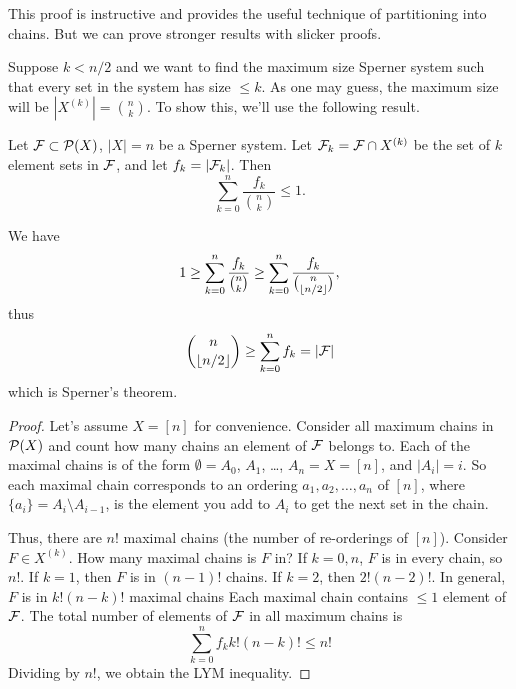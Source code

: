 \begin{remark}
This proof is instructive and provides the useful technique of partitioning into chains. But we can prove stronger results with slicker proofs.
\end{remark}
Suppose $k< n/2$ and we want to find the maximum size Sperner system such that every set in the system has size $\leq k$.
As one may guess, the maximum size will be $|X^{(k)}| = {n\choose k}$. To show this, we'll use the following result.
\begin{theorem} 
\label{thm:LYM_inequality}
Let $\F\subset \P(X)$, $|X|=n$ be a Sperner system.
Let $\F_k = \F\cap X^{(k)}$ be the set of $k$ element sets in $\F$, and let $f_k = |\F_k|$. Then
\begin{equation}	\tag{LYM} 
\label{eq:LYM}
\sum_{k=0}^n \frac{f_k}{{n\choose k}} \leq 1.
\end{equation}
\end{theorem}
\begin{remark}
We have
\[
1 \geq \sum_{k=0}^n \frac{f_k}{{n\choose k}} \geq \sum_{k=0}^n \frac{f_k}{{n\choose \floor{n/2}}},
\]
thus
\[
{n\choose \floor{n/2}} \geq \sum_{k=0}^n f_k = |\F|
\]
which is Sperner's theorem.
\end{remark}
\begin{proof} Let's assume $X=[n]$ for convenience.
Consider all maximum chains in $\P(X)$ and count how many chains an element of $\F$ belongs to. Each of the maximal chains is of the form $\emptyset = A_0$, $A_1$, \ldots, $A_n = X = [n]$, and $|A_i| = i$. So each maximal chain corresponds to an ordering $a_1,a_2,\dotsc,a_n$ of $[n]$, where $\{a_i\} = A_i \setminus A_{i-1}$, is the element you add to $A_i$ to get the next set in the chain.

Thus, there are $n!$ maximal chains (the number of re-orderings of $[n]$). Consider
$F \in X^{(k)}$.
How many  maximal chains is $F$ in? If $k=0,n$, $F$ is in every chain, so $n!$. If $k=1$, then $F$ is in $(n-1)!$ chains. If $k=2$, then $2!(n-2)!$. In general, $F$ is in $k!(n-k)!$ maximal chains Each maximal chain contains $\leq 1$ element of $\F$. The total number of elements of $\F$ in all maximum chains is
\[
 \sum_{k=0}^n f_k k!(n-k)!\leq n!
\]
Dividing by $n!$, we obtain the LYM inequality.
\end{proof}
